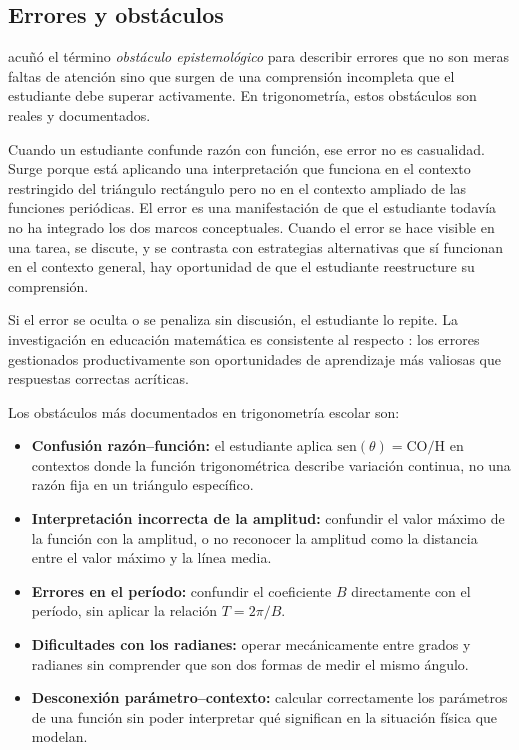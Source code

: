 \subsection{Errores y obstáculos}

\textcite{brousseauTheoryDidacticalSituations2002} acuñó el término \emph{obstáculo epistemológico} para describir errores que no son meras faltas de atención sino que surgen de una comprensión incompleta que el estudiante debe superar activamente. En trigonometría, estos obstáculos son reales y documentados.

Cuando un estudiante confunde razón con función, ese error no es casualidad. Surge porque está aplicando una interpretación que funciona en el contexto restringido del triángulo rectángulo pero no en el contexto ampliado de las funciones periódicas. El error es una manifestación de que el estudiante todavía no ha integrado los dos marcos conceptuales. Cuando el error se hace visible en una tarea, se discute, y se contrasta con estrategias alternativas que sí funcionan en el contexto general, hay oportunidad de que el estudiante reestructure su comprensión.

Si el error se oculta o se penaliza sin discusión, el estudiante lo repite. La investigación en educación matemática es consistente al respecto \parencite{brousseauTheoryDidacticalSituations2002, arhinAnalysisHighSchool2021}: los errores gestionados productivamente son oportunidades de aprendizaje más valiosas que respuestas correctas acríticas.

Los obstáculos más documentados en trigonometría escolar son:

\begin{itemize}
\item \textbf{Confusión razón–función:} el estudiante aplica $\mathrm{sen}(\theta) = \text{CO}/\text{H}$ en contextos donde la función trigonométrica describe variación continua, no una razón fija en un triángulo específico.
\item \textbf{Interpretación incorrecta de la amplitud:} confundir el valor máximo de la función con la amplitud, o no reconocer la amplitud como la distancia entre el valor máximo y la línea media.
\item \textbf{Errores en el período:} confundir el coeficiente $B$ directamente con el período, sin aplicar la relación $T = 2\pi/B$.
\item \textbf{Dificultades con los radianes:} operar mecánicamente entre grados y radianes sin comprender que son dos formas de medir el mismo ángulo.
\item \textbf{Desconexión parámetro–contexto:} calcular correctamente los parámetros de una función sin poder interpretar qué significan en la situación física que modelan.
\end{itemize}

